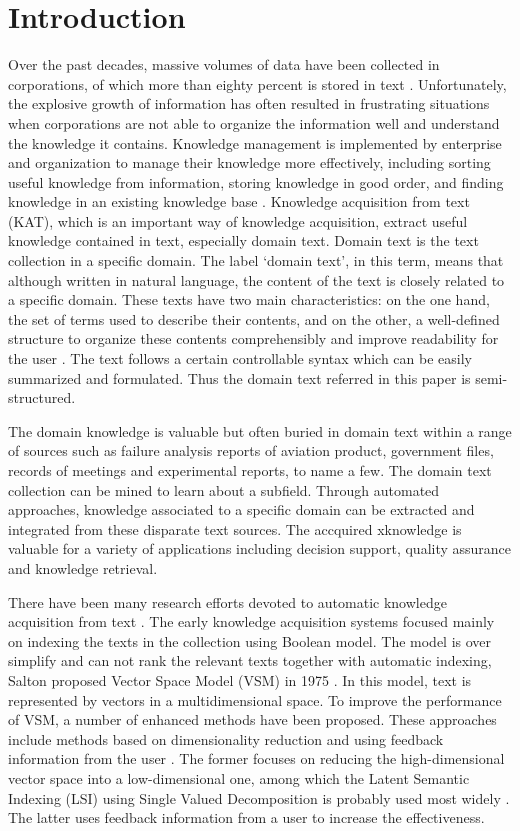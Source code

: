 \documentclass{elsarticle}
\begin{document}
\section{Introduction}
\label{sec:introduction}

Over the past decades, massive volumes of data have been collected in
corporations, of which more than eighty percent is stored in
text \cite{Mitchell2003}. Unfortunately, the explosive growth of
information has often resulted in frustrating situations when
corporations are not able to organize the information well and
understand the knowledge it contains. Knowledge management is
implemented by enterprise and organization to manage their knowledge
more effectively, including sorting useful knowledge from information, storing
knowledge in good order, and finding knowledge in an existing
knowledge base \cite{turban2001dss}. Knowledge acquisition from text
(KAT), which  is an important
way of knowledge acquisition, extract useful knowledge contained in
text, especially domain text. Domain text is the text collection in a specific domain. The label ‘domain text’, in this term,
means that although written in natural language, the content of the
text is closely related to a specific domain. These texts have two
main characteristics: on the one hand, the set of terms used to
describe their contents, and on the other, a well-defined structure to
organize these contents comprehensibly and improve readability for the
user \cite{Campos2004}. The text follows a certain controllable syntax
which can be easily summarized and formulated. Thus the domain text
referred in this paper is semi-structured. 

The domain knowledge is valuable but often buried in domain text
within a range of sources such as failure analysis reports of aviation
product, government files, records of meetings and experimental
reports, to name a few. The domain text collection can be mined to
learn about a subfield. Through automated approaches, knowledge
associated to a specific domain can be extracted and integrated from
these disparate text sources. The accquired xknowledge is valuable for a variety of applications including decision support, quality assurance and knowledge retrieval.

There have been many research efforts devoted to automatic knowledge
acquisition from text \cite{salton1975vsm,361220,215383,Tai2002,130346} . The early
knowledge acquisition systems focused mainly on indexing the
texts in the collection using Boolean model. The model is over
simplify and can not rank the relevant texts together with automatic
indexing, Salton proposed Vector Space Model (VSM) in 1975 \cite{salton1975vsm,361220}. In this model, text is represented by vectors in a multidimensional space. To improve the performance of VSM, a number of enhanced methods have been proposed. These approaches include methods based on dimensionality reduction and using feedback information from the user \cite{Tai2002}. The former focuses on reducing the high-dimensional vector space into a low-dimensional one, among which the Latent Semantic Indexing (LSI) using Single Valued Decomposition is probably used most widely \cite{130346}. The latter uses feedback information from a user to increase the effectiveness.
\end{document}
